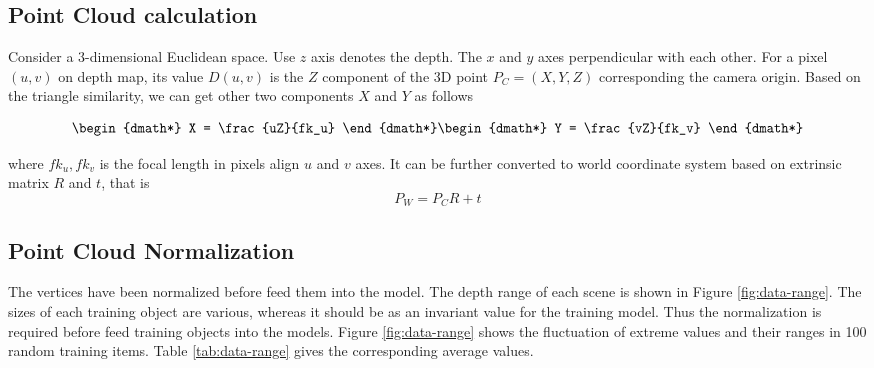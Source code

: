 \subsection{Point Cloud calculation}

Consider a 3-dimensional Euclidean space. Use $ z $ axis denotes the depth. The $ x  $ and $ y $ axes perpendicular with each other. For a pixel $ (u,v) $ on depth map, its value $ D(u,v) $ is the $ Z $ component of the 3D point $P_C = (X,Y,Z) $ corresponding the camera origin. Based on the triangle similarity, we can get other two components $ X $ and $ Y $ as follows

\begin{dgroup*}
	
	\begin{dmath*}
		X = \frac{uZ}{fk_u}
	\end{dmath*}
	\begin{dmath*}
		Y = \frac{vZ}{fk_v}
	\end{dmath*}
\end{dgroup*}

where $ fk_u, fk_v $ is the focal length in pixels align $ u $ and $ v $ axes.
It can be further converted to world coordinate system based on extrinsic matrix $ R $ and $ t $, that is
\[P_W = P_CR+t \]

\subsection{Point Cloud Normalization}


\label{sec:dataset-normalization}

The vertices have been normalized before feed them into the model. The depth range of each scene is shown in Figure \ref{fig:data-range}.
The sizes of each training object are various, whereas it should be as an invariant value for the training model. Thus the normalization is required before feed training objects into the models. Figure \ref{fig:data-range} shows the fluctuation of extreme values and their ranges in 100 random training items. Table \ref{tab:data-range} gives the corresponding average values.

